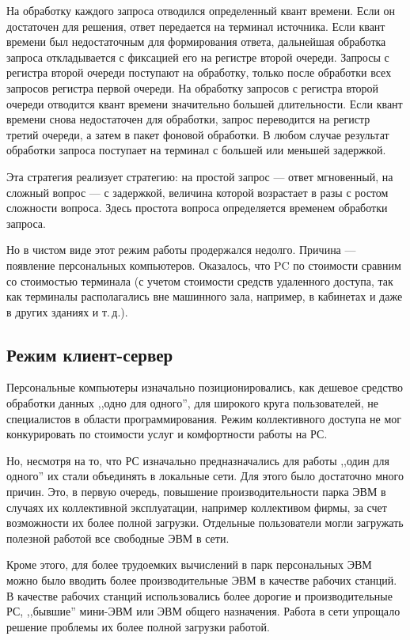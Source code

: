 \documentclass[a4paper, 10pt, notitlepage, pdftex,headsepline]{scrartcl}
\begin{document}
    На обработку каждого запроса отводился определенный квант времени.
    Если он достаточен для решения, ответ передается на терминал источника.
    Если квант времени был недостаточным для формирования ответа,
    дальнейшая обработка запроса откладывается с фиксацией его на
    регистре второй очереди.
    Запросы с регистра второй очереди поступают на обработку, только
    после обработки всех запросов регистра первой очереди.
    На обработку запросов с регистра второй очереди отводится квант
    времени значительно большей длительности.
    Если квант времени снова недостаточен для обработки, запрос
    переводится на регистр третий очереди, а затем в пакет фоновой обработки.
    В любом случае результат обработки запроса поступает на терминал с
    большей или меньшей задержкой.

    Эта стратегия реализует стратегию: на простой запрос --- ответ
    мгновенный, на сложный вопрос --- с задержкой, величина которой
    возрастает в разы с ростом сложности вопроса.
    Здесь простота вопроса определяется временем обработки запроса.

    Но в чистом виде этот режим работы продержался недолго.
    Причина --- появление персональных компьютеров.
    Оказалось, что PC по стоимости сравним со стоимостью терминала (с
    учетом стоимости средств удаленного доступа, так как терминалы
    располагались вне машинного зала, например, в кабинетах и даже в
    других зданиях и т.\,д.).
  \subsection{Режим клиент-сервер}
    Персональные компьютеры изначально позиционировались, как дешевое
    средство обработки данных ,,одно для одного'', для широкого круга
    пользователей, не специалистов в области программирования.
    Режим коллективного доступа не мог конкурировать по стоимости услуг
    и комфортности работы на РС.

    Но, несмотря на то, что РС изначально предназначались для работы
    ,,один для одного'' их стали объединять в локальные сети.
    Для этого было достаточно много причин.
    Это, в первую очередь, повышение производительности парка ЭВМ в
    случаях их коллективной эксплуатации, например коллективом фирмы, за
    счет возможности их более полной загрузки.
    Отдельные пользователи могли загружать полезной работой все
    свободные ЭВМ в сети.

    Кроме этого, для более трудоемких вычислений в парк персональных ЭВМ
    можно было вводить более производительные ЭВМ в качестве рабочих станций.
    В качестве рабочих станций использовались более дорогие и
    производительные РС, ,,бывшие'' мини-ЭВМ или ЭВМ общего назначения.
    Работа в сети упрощало решение проблемы их более полной загрузки работой.
\end{document}
